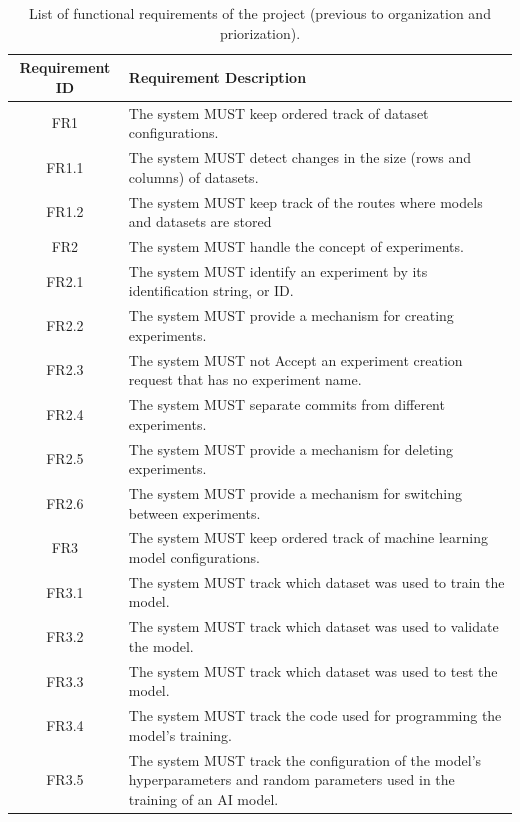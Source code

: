 \begin{table}[H]
	\centering
	\caption{List of functional requirements of the project (previous to organization and priorization).}
	\label{tab:functionalRequirements}
	\begin{tabular}{ | c | p{12cm} |}
		\hline
		\textbf{Requirement ID} & \textbf{Requirement Description} \\ \hline
		FR1     & The system MUST keep ordered track of dataset configurations. \\ \hline
		FR1.1   & The system MUST detect changes in the size (rows and columns) of datasets. \\ \hline
		FR1.2   & The system MUST keep track of the routes where models and datasets are stored \\ \hline
        FR2     & The system MUST handle the concept of experiments.\\ \hline
        FR2.1   & The system MUST identify an experiment by its identification string, or ID.\\ \hline
        FR2.2   & The system MUST provide a mechanism for creating experiments. \\ \hline
        FR2.3   & The system MUST not Accept an experiment creation request that has no experiment name.\\ \hline
        FR2.4   & The system MUST separate commits from different experiments. \\ \hline
        FR2.5   & The system MUST provide a mechanism for deleting experiments. \\ \hline
        FR2.6   & The system MUST provide a mechanism for switching between experiments.\\ \hline
        FR3     & The system MUST keep ordered track of machine learning model configurations.\\ \hline
        FR3.1   & The system MUST track which dataset was used to train the model.\\ \hline
        FR3.2   & The system MUST track which dataset was used to validate the model.\\ \hline
        FR3.3   & The system MUST track which dataset was used to test the model. \\ \hline
        FR3.4   & The system MUST track the code used for programming the model's training. \\ \hline
        FR3.5   & The system MUST track the configuration of the model's hyperparameters and random parameters used in the training of an AI model. \\ \hline

\end{tabular}
\end{table}
